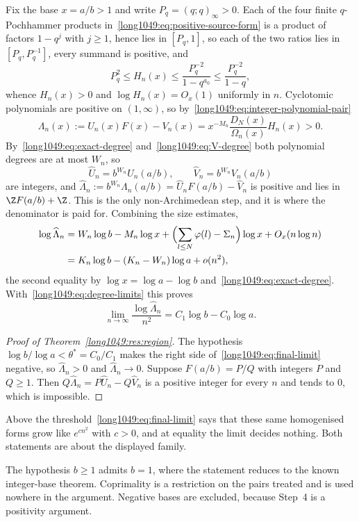 Fix the base $x=a/b>1$ and write $P_q=(q;q)_\infty>0$.  Each of the four finite
$q$-Pochhammer products in~\eqref{long1049:eq:positive-source-form} is a product of
factors $1-q^{j}$ with $j\ge1$, hence lies in $[P_q,1]$, so each of the two
ratios lies in $[P_q,P_q^{-1}]$, every summand is positive, and
\[
 P_q^{2}\le H_n(x)\le\frac{P_q^{-2}}{1-q^{a_0}}\le\frac{P_q^{-2}}{1-q},
\]
whence $H_n(x)>0$ and $\log H_n(x)=O_x(1)$ uniformly in $n$.  Cyclotomic
polynomials are positive on $(1,\infty)$, so
by~\eqref{long1049:eq:integer-polynomial-pair}
\[
 \Lambda_n(x):=U_n(x)F(x)-V_n(x)=x^{-M_n}\frac{D_N(x)}{\Omega_n(x)}H_n(x)>0 .
\]
By~\eqref{long1049:eq:exact-degree} and~\eqref{long1049:eq:V-degree} both polynomial degrees are
at most $W_n$, so
\[
 \widehat U_n=b^{W_n}U_n(a/b),\qquad \widehat V_n=b^{W_n}V_n(a/b)
\]
are integers, and $\widehat\Lambda_n:=b^{W_n}\Lambda_n(a/b)
=\widehat U_nF(a/b)-\widehat V_n$ is positive and lies in $\Z F(a/b)+\Z$.  This
is the only non-Archimedean step, and it is where the denominator is paid for.
Combining the size estimates,
\[
 \begin{aligned}
 \log\widehat\Lambda_n
 &=W_n\log b-M_n\log x+\Bigl(\sum_{l\le N}\varphi(l)-\Sigma_n\Bigr)\log x+O_x(n\log n)\\
 &=K_n\log b-(K_n-W_n)\log a+o(n^{2}),
\end{aligned}
\]
the second equality by $\log x=\log a-\log b$ and~\eqref{long1049:eq:exact-degree}.
With~\eqref{long1049:eq:degree-limits} this proves
\begin{equation}\label{long1049:eq:final-limit}
 \lim_{n\to\infty}\frac{\log\widehat\Lambda_n}{n^{2}}=C_1\log b-C_0\log a .
\end{equation}

\begin{proof}[Proof of Theorem~\ref{long1049:res:region}]
The hypothesis $\log b/\log a<\theta^{*}=C_0/C_1$ makes the right side
of~\eqref{long1049:eq:final-limit} negative, so $\widehat\Lambda_n>0$ and
$\widehat\Lambda_n\to0$.  Suppose $F(a/b)=P/Q$ with integers $P$ and $Q\ge1$.
Then $Q\widehat\Lambda_n=P\widehat U_n-Q\widehat V_n$ is a positive integer for
every $n$ and tends to $0$, which is impossible.
\end{proof}

\noindent Above the threshold~\eqref{long1049:eq:final-limit} says that these same
homogenised forms grow like $e^{cn^{2}}$ with $c>0$, and at equality the limit
decides nothing.  Both statements are about the displayed family.

\noindent The hypothesis $b\ge1$ admits $b=1$, where the statement reduces to
the known integer-base theorem.  Coprimality is a restriction on the pairs
treated and is used nowhere in the argument.  Negative bases are excluded,
because Step~4 is a positivity argument.

